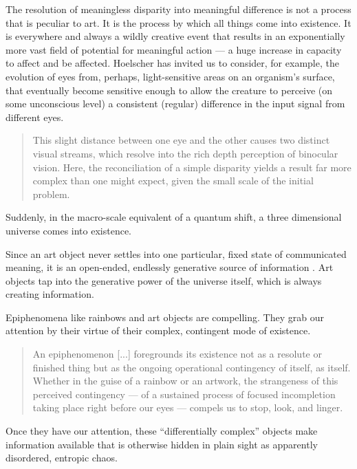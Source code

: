 \documentclass[letterpaper]{article}
\begin{document}
    The resolution of meaningless disparity into meaningful difference is not a process that is peculiar to art. It is the process by which all things come into existence. It is everywhere and always a wildly creative event that results in an exponentially more vast field of potential for meaningful action — a huge increase in capacity to affect and be affected. Hoelscher has invited us to consider, for example, the evolution of eyes from, perhaps, light-sensitive areas on an organism's surface, that eventually become sensitive enough to allow the creature to perceive (on some unconscious level) a consistent (regular) difference in the input signal from different eyes.

    \begin{quote}
        This slight distance between one eye and the other causes two distinct visual streams, which resolve into the rich depth perception of binocular vision. Here, the reconciliation of a simple disparity yields a result far more complex than one might expect, given the small scale of the initial problem. \citep[p.5]{HoelscherArtAsInfrmtn2021}
    \end{quote}
    
    Suddenly, in the macro-scale equivalent of a quantum shift, a three dimensional universe comes into existence.

    Since an art object never settles into one particular, fixed state of communicated meaning, it is an open-ended, endlessly generative source of information \citep[p.7]{HoelscherThPtcsOfPhsSpc2014}. Art objects tap into the generative power of the universe itself, which is always creating information.

    Epiphenomena like rainbows and art objects are compelling. They grab our attention by their virtue of their complex, contingent mode of existence.

    \begin{quote}
        An epiphenomenon [...] foregrounds its existence not as a resolute or finished thing but as the ongoing operational contingency of itself, as itself. Whether in the guise of a rainbow or an artwork, the strangeness of this perceived contingency — of a sustained process of focused incompletion taking place right before our eyes — compels us to stop, look, and linger.
    \end{quote}

    Once they have our attention, these “differentially complex” \citep[p.74]{HoelscherArtAsInfrmtn2021} objects make information available that is otherwise hidden in plain sight as apparently disordered, entropic chaos.
    
\end{document}
